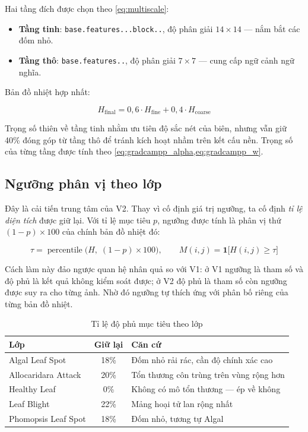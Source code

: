 Hai tầng đích được chọn theo \cref{eq:multiscale}:

\begin{itemize}
    \item \textbf{Tầng tinh}: \texttt{base.\allowbreak features...\allowbreak block..}, độ phân giải
          $14 \times 14$ --- nắm bắt các đốm nhỏ.
    \item \textbf{Tầng thô}: \texttt{base.\allowbreak features..}, độ phân giải
          $7 \times 7$ --- cung cấp ngữ cảnh ngữ nghĩa.
\end{itemize}

Bản đồ nhiệt hợp nhất:

\begin{equation}
    H_{\text{final}} = 0{,}6 \cdot H_{\text{fine}} + 0{,}4 \cdot H_{\text{coarse}}
    \label{eq:fusion_v2}
\end{equation}

Trọng số thiên về tầng tinh nhằm ưu tiên độ sắc nét của biên, nhưng vẫn giữ 40\%
đóng góp từ tầng thô để tránh kích hoạt nhầm trên kết cấu nền. Trọng số của từng
tầng được tính theo \cref{eq:gradcampp_alpha,eq:gradcampp_w}.

\subsection{Ngưỡng phân vị theo lớp}

Đây là cải tiến trung tâm của V2. Thay vì cố định giá trị ngưỡng, ta cố định
\emph{tỉ lệ diện tích} được giữ lại. Với tỉ lệ mục tiêu $p$, ngưỡng được tính là
phân vị thứ $(1 - p) \times 100$ của chính bản đồ nhiệt đó:

\begin{equation}
    \tau = \operatorname{percentile}\big(H,\; (1 - p) \times 100\big),
    \qquad
    M(i,j) = \mathbf{1}\big[H(i,j) \geq \tau\big]
    \label{eq:percentile}
\end{equation}

Cách làm này đảo ngược quan hệ nhân quả so với V1: ở V1 ngưỡng là tham số và độ
phủ là kết quả không kiểm soát được; ở V2 độ phủ là tham số còn ngưỡng được suy ra
cho từng ảnh. Nhờ đó ngưỡng tự thích ứng với phân bố riêng của từng bản đồ nhiệt.

\begin{table}[H]
\centering
\caption{Tỉ lệ độ phủ mục tiêu theo lớp}
\label{tab:keeppct}
\begin{tabular}{l c L{7.2cm}}
\toprule
\textbf{Lớp} & \textbf{Giữ lại} & \textbf{Căn cứ} \\
\midrule
Algal Leaf Spot     & 18\% & Đốm nhỏ rải rác, cần độ chính xác cao \\
Allocaridara Attack & 20\% & Tổn thương côn trùng trên vùng rộng hơn \\
Healthy Leaf        & 0\%  & Không có mô tổn thương --- ép về không \\
Leaf Blight         & 22\% & Mảng hoại tử lan rộng nhất \\
Phomopsis Leaf Spot & 18\% & Đốm nhỏ, tương tự Algal \\
\bottomrule
\end{tabular}
\end{table}

